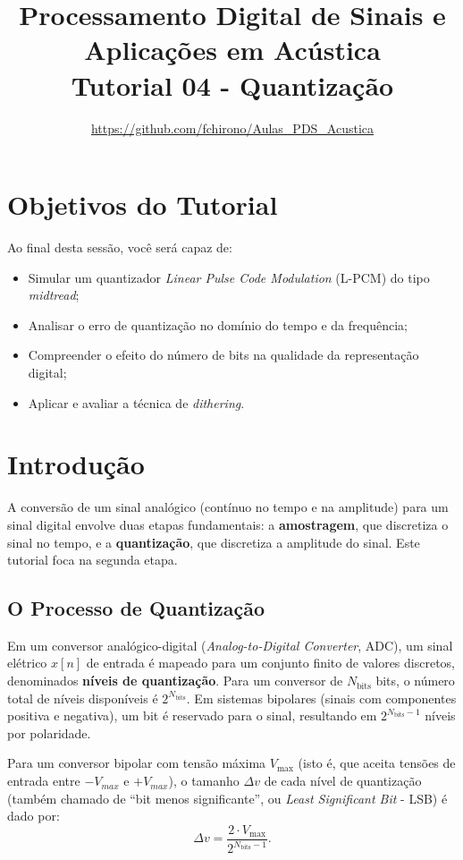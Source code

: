 \documentclass[a4paper,twoside,12pt]{article}
\title{\vspace{-2cm} Processamento Digital de Sinais e Aplicações em Acústica\\ Tutorial 04 - Quantização}
\author{\url{https://github.com/fchirono/Aulas_PDS_Acustica}}
\begin{document}
	\date{}
	\maketitle
	
	\section*{Objetivos do Tutorial}
	Ao final desta sessão, você será capaz de:
		\begin{itemize}
		\item Simular um quantizador \emph{Linear Pulse Code Modulation} (L-PCM) do tipo \textit{midtread};
		\item Analisar o erro de quantização no domínio do tempo e da frequência;
		\item Compreender o efeito do número de bits na qualidade da representação
		digital;
		\item Aplicar e avaliar a técnica de \textit{dithering}.
	\end{itemize}

	\begingroup
	\let\clearpage\relax
	\tableofcontents
	\endgroup
	
	
	\section{Introdução}
	
	A conversão de um sinal analógico (contínuo no tempo e na amplitude) para um sinal digital envolve duas etapas fundamentais: a \textbf{amostragem}, que discretiza o sinal no tempo, e a \textbf{quantização}, que discretiza a amplitude do sinal. Este tutorial foca na segunda etapa.
	
	\subsection{O Processo de Quantização}
	
	Em um conversor analógico-digital (\textit{Analog-to-Digital Converter}, ADC), um sinal elétrico $x[n]$ de entrada é mapeado para um conjunto finito de valores discretos, denominados \textbf{níveis de quantização}. Para um conversor de $N_\text{bits}$ bits, o número total de níveis disponíveis é $2^{N_\text{bits}}$. Em sistemas bipolares (sinais com componentes positiva e negativa), um bit é reservado para o sinal, resultando em $2^{N_\text{bits}-1}$ níveis por polaridade. 
		
	Para um conversor bipolar com tensão máxima $V_\text{max}$ (isto é, que aceita tensões de entrada entre $-V_{max}$ e $+V_{max}$), o tamanho $\Delta v$ de cada nível de quantização (também chamado de ``bit menos significante'', ou \textit{Least Significant Bit} - LSB) é dado por:
	\begin{equation}
		\Delta v = \frac{2 \cdot V_\text{max}}{2^{N_\text{bits}-1}}.
		\label{eq:lsb}
	\end{equation}
	
\end{document}
